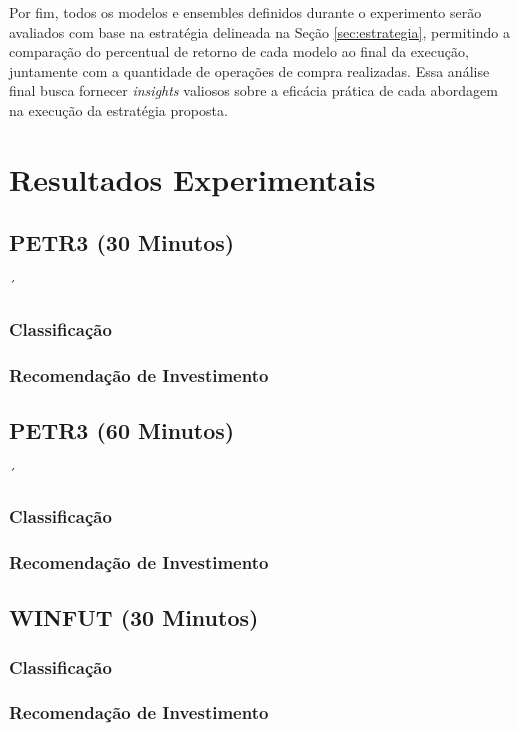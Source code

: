 Por fim, todos os modelos e ensembles definidos durante o experimento serão avaliados com base na estratégia delineada na Seção \ref{sec:estrategia}, permitindo a comparação do percentual de retorno de cada modelo ao final da execução, juntamente com a quantidade de operações de compra realizadas. Essa análise final busca fornecer \textit{insights} valiosos sobre a eficácia prática de cada abordagem na execução da estratégia proposta.

\section{Resultados Experimentais}
\label{sec:resultados_experimentais}
\subsection{PETR3 (30 Minutos)}´
\subsubsection{Classificação}
\subsubsection{Recomendação de Investimento}

\subsection{PETR3 (60 Minutos)}´
\subsubsection{Classificação}
\subsubsection{Recomendação de Investimento}

\subsection{WINFUT (30 Minutos)}
\subsubsection{Classificação}
\subsubsection{Recomendação de Investimento}

